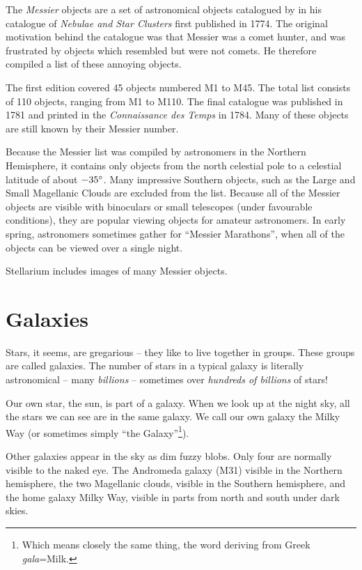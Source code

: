 The \emph{Messier} objects are a set of astronomical objects catalogued
by  in his catalogue of \emph{Nebulae and Star Clusters}
first published in 1774. The original motivation behind the catalogue
was that Messier was a comet hunter, and was frustrated by objects which
resembled but were not comets. He therefore compiled a list of these annoying 
objects.

The first edition covered 45 objects numbered M1 to M45. The total list
consists of 110 objects, ranging from M1 to M110. The final catalogue
was published in 1781 and printed in the \emph{Connaissance des Temps}
in 1784. Many of these objects are still known by their Messier number.

Because the Messier list was compiled by astronomers in the Northern
Hemisphere, it contains only objects from the north celestial pole to a
celestial latitude of about $-35\degree$. Many impressive Southern objects, such
as the Large and Small Magellanic Clouds are excluded from the list.
Because all of the Messier objects are visible with binoculars or small
telescopes (under favourable conditions), they are popular viewing
objects for amateur astronomers. In early spring, astronomers sometimes
gather for ``Messier Marathons'', when all of the objects can be viewed
over a single night.

Stellarium includes images of many Messier objects.


\section{Galaxies}
\label{sec:Phenomena:Galaxies}

Stars, it seems, are gregarious -- they like to live together in groups.
These groups are called galaxies. The number of stars in a typical
galaxy is literally astronomical -- many \emph{billions} -- sometimes over
\emph{hundreds of billions} of stars!

Our own star, the sun, is part of a galaxy. When we look up at the
night sky, all the stars we can see are in the same galaxy. We call
our own galaxy the Milky Way (or sometimes simply ``the
Galaxy''\footnote{Which means closely the same thing, the word
  deriving from Greek \emph{gala}=Milk.}).

Other galaxies appear in the sky as dim fuzzy blobs. Only four are
normally visible to the naked eye. The Andromeda galaxy (M31) visible in
the Northern hemisphere, the two Magellanic clouds, visible in the
Southern hemisphere, and the home galaxy Milky Way, visible in parts
from north and south under dark skies.

